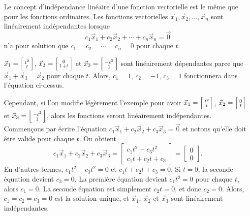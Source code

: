 Le concept d'indépendance linéaire d'une fonction vectorielle est le même que pour les fonctions ordinaires. Les fonctions vectorielles
$\vec{x}_1,\vec{x}_2,\ldots,\vec{x}_n$ sont linéairement indépendantes
lorsque
\begin{equation*}
c_1 \vec{x}_1 + c_2 \vec{x}_2 + \cdots + c_n \vec{x}_n = \vec{0}
\end{equation*}
n'a pour solution que $c_1 = c_2 = \cdots = c_n = 0$ pour chaque $t$.

\begin{example}
$\vec{x}_1 = \Bigl[ \begin{smallmatrix} t^2 \\ t \end{smallmatrix} \Bigr]$,
$\vec{x}_2 = \Bigl[ \begin{smallmatrix} 0 \\ 1+t \end{smallmatrix} \Bigr]$ et
$\vec{x}_3 = \Bigl[ \begin{smallmatrix} -t^2 \\ 1 \end{smallmatrix} \Bigr]$
sont linéairement dépendantes parce que
$\vec{x}_1 + \vec{x}_3 = \vec{x}_2$ pour chaque $t$. Alors, $c_1 =
1$, $c_2 = -1$, $c_3 = 1$ fonctionnera dans l'équation ci-dessus.

Cependant, si l'on modifie légèrement l'exemple pour avoir
$\vec{x}_1 = \Bigl[ \begin{smallmatrix} t^2 \\ t \end{smallmatrix} \Bigr]$,
$\vec{x}_2 = \Bigl[ \begin{smallmatrix} 0 \\ t \end{smallmatrix} \Bigr]$ et
$\vec{x}_3 = \Bigl[ \begin{smallmatrix} -t^2 \\ 1 \end{smallmatrix}
\Bigr]$,
alors les fonctions seront linéairement indépendantes. Commençons par écrire l'équation
$c_1 \vec{x}_1 + c_2 \vec{x}_2 + c_3 \vec{x}_3 = \vec{0}$ et notons qu'elle doit être valide pour chaque $t$. On obtient
\begin{equation*}
c_1 \vec{x}_1 + c_2 \vec{x}_2 + c_3 \vec{x}_3
=
\begin{bmatrix}
c_1 t^2 - c_3 t^2
\\
c_1 t + c_2 t + c_3 
\end{bmatrix}
=
\begin{bmatrix}
0
\\
0
\end{bmatrix} .
\end{equation*}
En d'autres termes,
$c_1 t^2 - c_3 t^2 = 0$ et
$c_1 t + c_2 t + c_3 = 0$.
Si $t = 0$, la seconde équation devient $c_3 = 0$. La première équation devient
$c_1 t^2 = 0$ pour chaque $t$, alors $c_1 = 0$. La seconde équation est simplement $c_2 t = 0$, et donc $c_2 = 0$. Alors, $c_1 = c_2 = c_3 = 0$
est la solution unique, et $\vec{x}_1$,
$\vec{x}_2$ et $\vec{x}_3$ sont linéairement indépendantes.
\end{example}

